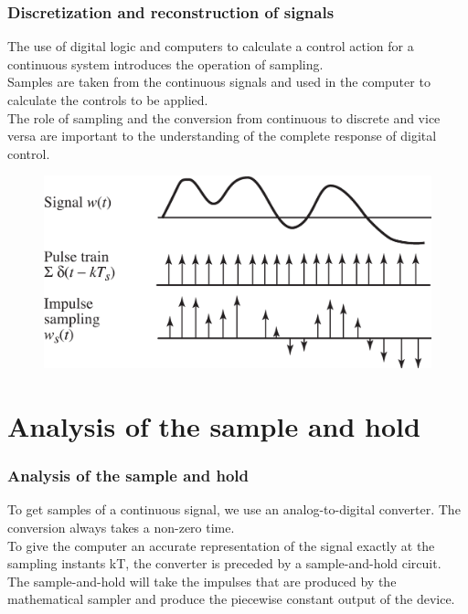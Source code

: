 \begin{frame}
	\frametitle{Discretization and reconstruction of signals}
	The use of digital logic and computers to calculate a control action for a continuous system introduces the operation of sampling.\\
	\medskip
	Samples are taken from the continuous signals and used in the computer to calculate the controls to be applied.\\
	\medskip
	The role of sampling and the conversion from continuous to discrete and vice versa are important to the understanding of the complete response of digital control.
	\begin{figure}
		\includegraphics[width=.6\linewidth]{discretization}
	\end{figure}
\end{frame}

\section{Analysis of the sample and hold}

\begin{frame}
	\frametitle{Analysis of the sample and hold}
	\vspace{-6ex}
	To get samples of a continuous signal, we use an analog-to-digital converter. The conversion always takes a non-zero time.\\
	\medskip
	To give the computer an accurate representation of the signal exactly at the sampling instants kT, the converter is preceded by a sample-and-hold circuit.\\
	The sample-and-hold will take the impulses that are produced by the mathematical sampler and produce the piecewise constant output of the device.
\end{frame}

